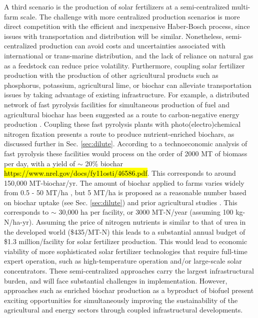 A third scenario is the production of solar fertilizers at a semi-centralized multi-farm scale. The challenge with more centralized production scenarios is more direct competition with the efficient and inexpensive Haber-Bosch process, since issues with transportation and distribution will be similar. Nonetheless, semi-centralized production can avoid costs and uncertainties associated with international or trans-marine distribution, and the lack of reliance on natural gas as a feedstock can reduce price volatility. Furthermore, coupling solar fertilizer production with the production of other agricultural products such as phosphorus, potassium, agricultural lime, or biochar can alleviate transportation issues by taking advantage of existing infrastructure. For example, a distributed network of fast pyrolysis facilities for simultaneous production of fuel and agricultural biochar has been suggested as a route to carbon-negative energy production \cite{Lehmann2007,Lehmann_2007, Glaser2002}. Coupling these fast pyrolysis plants with photo(electro)chemical nitrogen fixation presents a route to produce nutrient-enriched biochars, as discussed further in Sec. \ref{sec:dilute}. According to a technoeconomic analysis of fast pyrolysis these facilities would process on the order of 2000 MT of biomass per day, with a yield of $\sim$ 20\% biochar  \needcite \hl{https://www.nrel.gov/docs/fy11osti/46586.pdf}. This corresponds to around 150,000 MT-biochar/yr. The amount of biochar applied to farms varies widely from 0.5 - 50 MT/ha \cite{Galinato2011}, but 5 MT/ha is proposed as a reasonable number based on biochar uptake (see Sec. \ref{sec:dilute}) and prior agricultural studies \cite{Galinato2011}. This corresponds to $\sim$ 30,000 ha per facility, or 3000 MT-N/year (assuming 100 kg-N/ha-yr). Assuming the price of nitrogen nutrients is similar to that of urea in the developed world (\$435/MT-N) this leads to a substantial annual budget of \$1.3 million/facility for solar fertilizer production. This would lead to economic viability of more sophisticated solar fertilizer technologies that require full-time expert operation, such as high-temperature operation and/or large-scale solar concentrators. These semi-centralized approaches carry the largest infrastructural burden, and will face substantial challenges in implementation. However, approaches such as enriched biochar production as a byproduct of biofuel present exciting opportunities for simultaneously improving the sustainability of the agricultural and energy sectors through coupled infrastructural developments.

